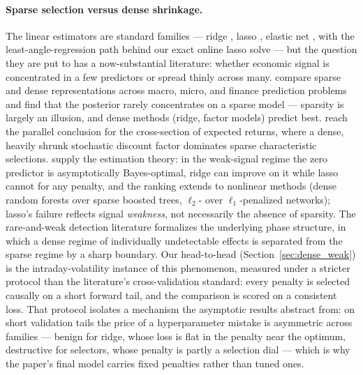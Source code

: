 \paragraph{Sparse selection versus dense shrinkage.}
The linear estimators are standard families --- ridge
\citep{HoerlKennard1970}, lasso \citep{Tibshirani1996}, elastic net
\citep{ZouHastie2005}, with the least-angle-regression path
\citep{Efron2004} behind our exact online lasso solve --- but the
question they are put to has a now-substantial literature: whether
economic signal is concentrated in a few predictors or spread thinly
across many. \citet{GiannoneLenzaPrimiceri2021} compare sparse and
dense representations across macro, micro, and finance prediction
problems and find that the posterior rarely concentrates on a sparse
model --- sparsity is largely an illusion, and dense methods (ridge,
factor models) predict best. \citet{KozakNagelSantosh2020} reach the
parallel conclusion for the cross-section of expected returns, where a
dense, heavily shrunk stochastic discount factor dominates sparse
characteristic selections. \citet{ShenXiu2025} supply the estimation
theory: in the weak-signal regime the zero predictor is asymptotically
Bayes-optimal, ridge can improve on it while lasso cannot for any
penalty, and the ranking extends to nonlinear methods (dense random
forests over sparse boosted trees, $\ell_2$- over $\ell_1$-penalized
networks); lasso's failure reflects signal \emph{weakness}, not
necessarily the absence of sparsity. The rare-and-weak detection
literature \citep{DonohoJin2004} formalizes the underlying phase
structure, in which a dense regime of individually undetectable
effects is separated from the sparse regime by a sharp boundary. Our
head-to-head (Section~\ref{sec:dense_weak}) is the
intraday-volatility instance of this phenomenon, measured under a
stricter protocol than the literature's cross-validation standard:
every penalty is selected causally on a short forward tail, and the
comparison is scored on a consistent loss. That protocol isolates a
mechanism the asymptotic results abstract from: on short validation
tails the price of a hyperparameter mistake is asymmetric across
families --- benign for ridge, whose loss is flat in the penalty near
the optimum, destructive for selectors, whose penalty is partly a
selection dial --- which is why the paper's final model carries fixed
penalties rather than tuned ones.

